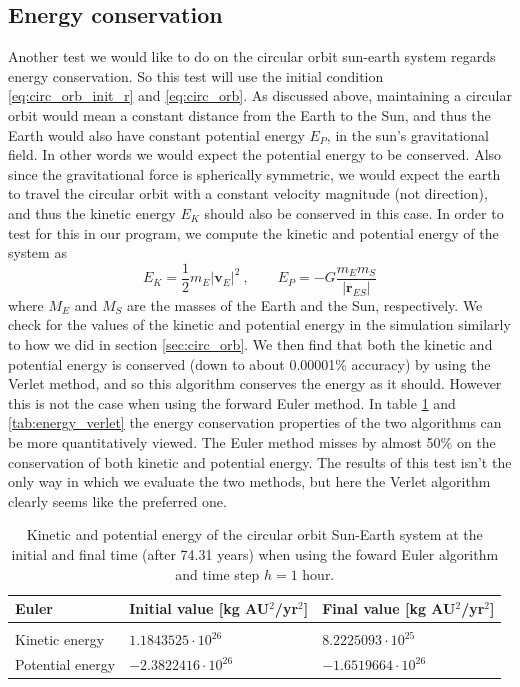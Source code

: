 \documentclass[12pt]{article}
\numberwithin{figure}{section}
\numberwithin{table}{section}
\begin{document}
\subsection{Energy conservation} \label{sec:energy_conservation}
Another test we would like to do on the circular orbit sun-earth system regards energy conservation. So this test will use the initial condition \eqref{eq:circ_orb_init_r} and \eqref{eq:circ_orb}. As discussed above, maintaining a circular orbit would mean a constant distance from the Earth to the Sun, and thus the Earth would also have constant potential energy $E_P$, in the sun's gravitational field. In other words we would expect the potential energy to be conserved. Also since the gravitational force is spherically symmetric, we would expect the earth to travel the circular orbit with a constant velocity magnitude (not direction), and thus the kinetic energy $E_K$ should also be conserved in this case. In order to test for this in our program, we compute the kinetic and potential energy of the system as 
\begin{equation}
	E_K=\frac{1}{2}m_E|\mathbf{v}_E|^2 \ , \qquad E_P=-G\frac{m_Em_S}{|\mathbf{r}_{ES}|}
\end{equation}
where $M_E$ and $M_S$ are the masses of the Earth and the Sun, respectively. We check for the values of the kinetic and potential energy in the simulation similarly to how we did in section \ref{sec:circ_orb}. We then find that both the kinetic and potential energy is conserved (down to about 0.00001\% accuracy) by using the Verlet method, and so this algorithm conserves the energy as it should. However this is not the case when using the forward Euler method. In table \ref{tab:energy_euler} and \ref{tab:energy_verlet} the energy conservation properties of the two algorithms can be more quantitatively viewed. The Euler method misses by almost 50\% on the conservation of both kinetic and potential energy. The results of this test isn't the only way in which we evaluate the two methods, but here the Verlet algorithm clearly seems like the preferred one. \\

\begin{table}[ht]
\begin{center}
  \begin{tabular}{| l | l | l |}
  \hline
    Euler &  Initial value [kg AU$^2$/yr$^2$] & Final value [kg AU$^2$/yr$^2$]\\[0.10cm]\hline\hline
     & &\\
     Kinetic energy & $1.1843525\cdot 10^{26}$ & $8.2225093\cdot 10^{25}$\\[0.10cm]
     Potential energy & $-2.3822416\cdot 10^{26}$ & $-1.6519664\cdot 10^{26}$\\[0.10cm]
     \hline
  \end{tabular}
\end{center}
\caption{Kinetic and potential energy of the circular orbit Sun-Earth system at the initial and final time (after 74.31 years) when using the foward Euler algorithm and time step $h=1$ hour.}
\label{tab:energy_euler}
\end{table}
\end{document}
